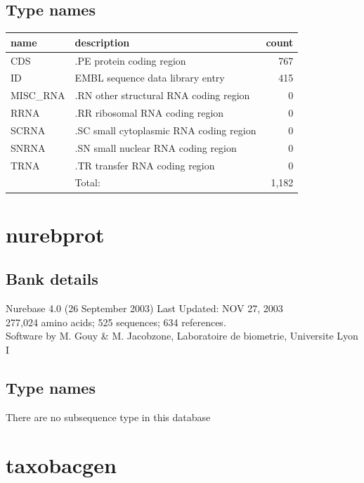 \documentclass{article}
\begin{document}
\begin{Schunk}
\subsection{Type names}
\noindent\begin{tabular}{llr}
\hline \hline
name & description & count \\
\hline
CDS  &  .PE protein coding region  &  767 \\
ID  &  EMBL sequence data library entry  &  415 \\
MISC\_RNA  &  .RN other structural RNA coding region  &  0 \\
RRNA  &  .RR ribosomal RNA coding region  &  0 \\
SCRNA  &  .SC small cytoplasmic RNA coding region  &  0 \\
SNRNA  &  .SN small nuclear RNA coding region  &  0 \\
TRNA  &  .TR transfer RNA coding region  &  0 \\
\hline
 & Total: & 1,182 \\
\hline \hline
\end{tabular}

\section{ nurebprot }
\subsection{Bank details}
Nurebase 4.0 (26 September 2003) Last Updated: NOV 27, 2003\\
277,024 amino acids; 525 sequences; 634 references.\\
Software by M. Gouy \& M. Jacobzone, Laboratoire de biometrie, Universite Lyon I

\subsection{Type names}
There are no subsequence type in this database
\section{ taxobacgen }

\end{Schunk}
\end{document}
